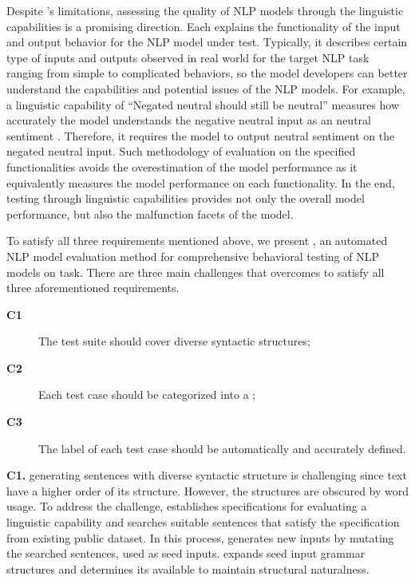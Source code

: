 Despite \Cklst's limitations, assessing the quality of NLP models
through the linguistic capabilities is a promising direction. Each \lc
explains the functionality of the input and output behavior for the
NLP model under test. Typically, it describes certain type of inputs
and outputs observed in real world for the target NLP task ranging
from simple to complicated behaviors, so the model developers can
better understand the capabilities and potential issues of the NLP
models. For example, a linguistic capability of ``Negated neutral
should still be neutral'' measures how accurately the \sa model
understands the negative neutral input as an neutral sentiment
\cite{marcoACL2020checklist}.  Therefore, it requires the \sa model to
output neutral sentiment on the negated neutral input.  Such
methodology of evaluation on the specified functionalities avoids the
overestimation of the model performance as it equivalently measures
the model performance on each functionality.
In the end, testing through linguistic capabilities provides not only
the overall model performance, but also the malfunction facets of the
model.

To satisfy all three requirements mentioned above, we present \tool,
an automated NLP model evaluation method for comprehensive behavioral
testing of NLP models on \sa task.  There are three main challenges
that \tool overcomes to satisfy all three aforementioned requirements.
\begin{description}
\item[{\bf C1}] The test suite should cover diverse syntactic structures;
\item[{\bf C2}] Each test case should be categorized into a \lc;
\item[{\bf C3}] The label of each test case should be automatically
  and accurately defined.
\end{description}

\noindent \textbf{C1.} generating sentences with diverse syntactic
structure is challenging since text have a higher order of its
structure. However, the structures are obscured by word usage. To
address the challenge, \tool establishes specifications for evaluating
a linguistic capability and searches suitable sentences that satisfy
the specification from existing public dataset. In this process, \tool
generates new inputs by mutating the searched sentences, used as seed
inputs. \tool expands seed input grammar structures and determines its
available \pos to maintain structural naturalness.


